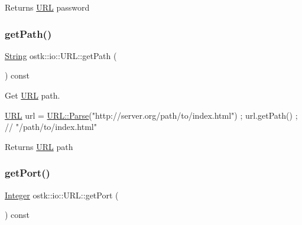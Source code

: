 \begin{DoxyReturn}{Returns}
\hyperlink{classostk_1_1io_1_1_u_r_l}{U\+RL} password 
\end{DoxyReturn}
\mbox{\label{classostk_1_1io_1_1_u_r_l_aba0a0da071c5ac9d7a79f24672b769ab}} 
\subsubsection{\texorpdfstring{get\+Path()}{getPath()}}
{\footnotesize\ttfamily \hyperlink{namespaceostk_1_1io_a95d49b120613a7610cb1b4f03b1116b6}{String} ostk\+::io\+::\+U\+R\+L\+::get\+Path (\begin{DoxyParamCaption}{ }\end{DoxyParamCaption}) const}



Get \hyperlink{classostk_1_1io_1_1_u_r_l}{U\+RL} path. 


\begin{DoxyCode}
\hyperlink{classostk_1_1io_1_1_u_r_l_a2537e046cef4ac966cc295abb81279c2}{URL} url = \hyperlink{classostk_1_1io_1_1_u_r_l_a1cd7216bb1079f62386a218ba510958d}{URL::Parse}(\textcolor{stringliteral}{"http://server.org/path/to/index.html"}) ;
url.getPath() ; \textcolor{comment}{// "/path/to/index.html"}
\end{DoxyCode}


\begin{DoxyReturn}{Returns}
\hyperlink{classostk_1_1io_1_1_u_r_l}{U\+RL} path 
\end{DoxyReturn}
\mbox{\label{classostk_1_1io_1_1_u_r_l_a471a0b1cb0bd5ab83b2798e1dc71e2d1}} 
\subsubsection{\texorpdfstring{get\+Port()}{getPort()}}
{\footnotesize\ttfamily \hyperlink{namespaceostk_1_1io_a35328f680550d000b2754860bbe1d268}{Integer} ostk\+::io\+::\+U\+R\+L\+::get\+Port (\begin{DoxyParamCaption}{ }\end{DoxyParamCaption}) const}



